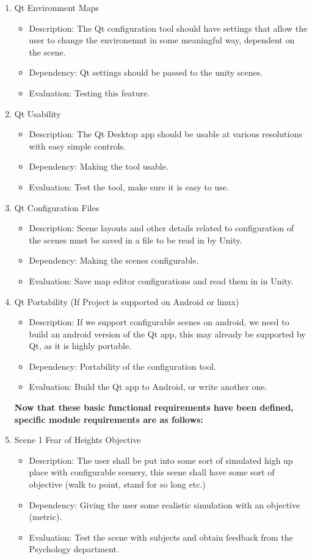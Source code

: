 \documentclass[a4paper,10pt]{article}
\begin{document}
\begin{enumerate}
\begin{itemize}
		\end{itemize}
		\item Qt Environment Maps
		\begin{itemize}
		\item Description: The Qt configuration tool should have settings that allow the user to change the environemnt in some meaningful way, dependent on the scene.
		\item Dependency:  Qt settings should be passed to the unity scenes. 
		\item Evaluation:  Testing this feature.
		\end{itemize}
		\item Qt Usability
		\begin{itemize}
		\item Description: The Qt Desktop app should be usable at various resolutions with easy simple controls. 
		\item Dependency:  Making the tool usable.
		\item Evaluation:  Test the tool, make sure it is easy to use.
		\end{itemize}
		
		\item Qt Configuration Files
		\begin{itemize}
		\item Description: Scene layouts and other details related to configuration of the scenes must be saved in a file to be read in by Unity.
		\item Dependency:  Making the scenes configurable.
		\item Evaluation:  Save map editor configurations and read them in in Unity.
		\end{itemize}
		\item Qt Portability (If Project is supported on Android or linux)
		\begin{itemize}
		\item Description: If we support configurable scenes on android, we need to build an android version of the Qt app, this may already be supported by Qt, as it is highly portable.
		\item Dependency:  Portability of the configuration tool.
		\item Evaluation:  Build the Qt app to Android, or write another one. 
		\end{itemize}
		\textbf{Now that these basic functional requirements have been defined, specific module requirements are as follows:}
		
		\item Scene 1 Fear of Heights Objective 
		\begin{itemize}
		\item Description: The user shall be put into some sort of simulated high up place with configurable scenery, this scene shall have some sort of objective (walk to point, stand for so long etc.)
		\item Dependency: Giving the user some realistic simulation with an objective (metric).
		\item Evaluation: Test the scene with subjects and obtain feedback from the Psychology department. 
		\end{itemize}
	

\end{enumerate}
\end{document}
